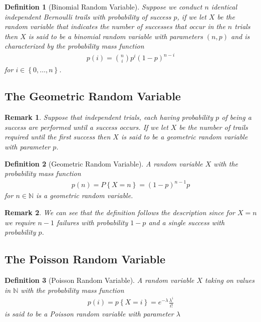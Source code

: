\documentclass[11pt, oneside]{book}   	%
\newtheorem{definition}{Definition}[chapter]
\newtheorem{remark}{Remark}[chapter]
\begin{document}
\begin{spacing}{1.618}
\begin{definition}[Binomial Random Variable]
	Suppose we conduct $n$ identical independent Bernoulli trails with probability of success $p$, if we let $X$ be the random variable that indicates the number of successes that occur in the $n$ trials then $X$ is said to be a binomial random variable with parameters $(n, p)$ and is characterized by the probability mass function
	\begin{alignat}{4}
		p(i)=\binom{n}{i}p^i(1-p)^{n-i}
	\end{alignat}
	for $i\in \left\{0, \dots, n\right\}$. 
\end{definition}

\subsection{The Geometric Random Variable}

\begin{remark}
	Suppose that independent trials, each having probability $p$ of being a success are performed until a success occurs. If we let $X$ be the number of trails required until the first success then $X$ is said to be a geometric random variable with parameter $p$. 
\end{remark}

\begin{definition}[Geometric Random Variable]
	A random variable $X$ with the probability mass function
	\begin{alignat}{4}
		p(n)=P\left\{X=n\right\} = (1-p)^{n-1}p
	\end{alignat}
	for $n\in\mathbb{N}$ is a geometric random variable. 
\end{definition}

\begin{remark}
	We can see that the definition follows the description since for $X=n$ we require $n-1$ failures with probability $1-p$ and a single success with probability $p$. 
\end{remark}

\subsection{The Poisson Random Variable}

\begin{definition}[Poisson Random Variable]
	A random variable $X$ taking on values in $\mathbb{N}$ with the probability mass function 
	\begin{alignat}{4}
		p(i)=p\left\{X=i\right\} = e^{-\lambda}\frac{\lambda^i}{i!}
	\end{alignat}
	is said to be a Poisson random variable with parameter $\lambda$
\end{definition}


\end{spacing}
\end{document}
